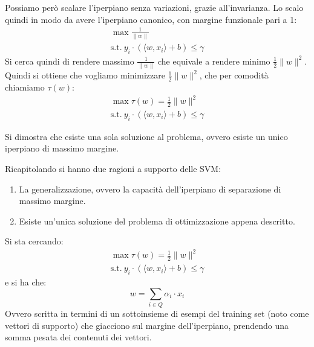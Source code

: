 Possiamo però scalare l'iperpiano senza variazioni, grazie all'invarianza.
Lo scalo quindi in modo da avere l'iperpiano canonico, con margine funzionale
pari a 1:
\begin{equation*}
    \begin{aligned}
        \max \frac{1}{\|w\|} \\ \text{s.t.} \ y_i \cdot (\langle w, x_i \rangle + b) \leq \gamma
    \end{aligned}
\end{equation*}
Si cerca quindi di rendere massimo $\frac{1}{\|w\|}$ che equivale a rendere
minimo $\frac{1}{2} \| w \|^2$. Quindi si ottiene che vogliamo minimizzare
$\frac{1}{2} \| w \|^2$, che per comodità chiamiamo $\tau (w)$:
\begin{equation*}
    \begin{aligned}
        \max \tau(w) = \frac{1}{2}  \| w\|^2 \\ \text{s.t.} \ y_i \cdot (\langle w, x_i \rangle + b) \leq \gamma
    \end{aligned}
\end{equation*}
\begin{teorema}
    Si dimostra che esiste una sola soluzione al problema, ovvero esiste un unico
    iperpiano di massimo margine.
\end{teorema}
Ricapitolando si hanno due ragioni a supporto delle SVM:
\begin{enumerate}
    \item La generalizzazione, ovvero la capacità dell'iperpiano di separazione
          di massimo margine.
    \item Esiste un'unica soluzione del problema di ottimizzazione appena descritto.
\end{enumerate}
Si sta cercando:
\begin{equation*}
    \begin{aligned}
        \max \tau(w) = \frac{1}{2}  \| w\|^2 \\ \text{s.t.} \ y_i \cdot (\langle w, x_i \rangle + b) \leq \gamma
    \end{aligned}
\end{equation*}
e si ha che:
\begin{equation}
    w = \sum_{i \in Q} \alpha_i \cdot x_i
\end{equation}
Ovvero scritta in termini di un sottoinsieme di esempi del training set
(noto come vettori di supporto) che giacciono sul margine dell'iperpiano, prendendo
una somma pesata dei contenuti dei vettori.

